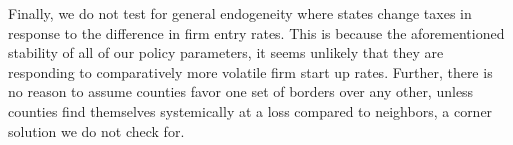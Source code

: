 Finally, we do not test for general endogeneity where states change taxes in response to the difference in firm entry rates. This is because the aforementioned stability of all of our policy parameters, it seems unlikely that they are responding to comparatively more volatile firm start up rates. Further, there is no reason to assume counties favor one set of borders over any other, unless counties find themselves systemically at a loss compared to neighbors, a corner solution we do not check for.